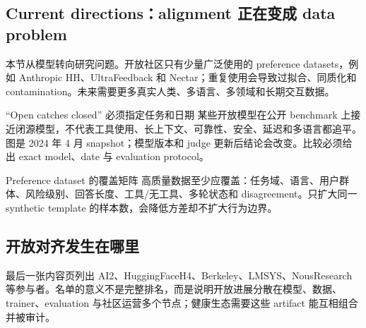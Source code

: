 
\subsection{Current directions：alignment 正在变成 data problem}

本节从模型转向研究问题。开放社区只有少量广泛使用的 preference datasets，例如 Anthropic HH、UltraFeedback 和 Nectar；重复使用会导致过拟合、同质化和 contamination。未来需要更多真实人类、多语言、多领域和长期交互数据。



\begin{warningbox}{“Open catches closed” 必须指定任务和日期}
某些开放模型在公开 benchmark 上接近闭源模型，不代表工具使用、长上下文、可靠性、安全、延迟和多语言都追平。图是 2024 年 4 月 snapshot；模型版本和 judge 更新后结论会改变。比较必须给出 exact model、date 与 evaluation protocol。
\end{warningbox}


\begin{importantbox}{Preference dataset 的覆盖矩阵}
高质量数据至少应覆盖：任务域、语言、用户群体、风险级别、回答长度、工具/无工具、多轮状态和 disagreement。只扩大同一 synthetic template 的样本数，会降低方差却不扩大行为边界。
\end{importantbox}


\subsection{开放对齐发生在哪里}

最后一张内容页列出 AI2、HuggingFaceH4、Berkeley、LMSYS、NousResearch 等参与者。名单的意义不是完整排名，而是说明开放进展分散在模型、数据、trainer、evaluation 与社区运营多个节点；健康生态需要这些 artifact 能互相组合并被审计。

